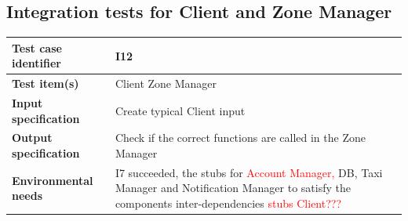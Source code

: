 \documentclass[a4paper,11pt]{report} %
\begin{document}
		\subsection{Integration tests for Client and Zone Manager}
			\begin{minipage}{\linewidth}
			\end{minipage}		
		\begin{center}
			\renewcommand{\arraystretch}{1.2}
			\setlength{\tabcolsep}{24pt}
			\begin{tabular}{ l  p{9cm}}\hline
				\textbf{Test case identifier} & I12\\\hline
				\textbf{Test item(s)} & Client \textrightarrow Zone Manager\\\hline
				\textbf{Input specification} & Create typical Client input \\\hline
				\textbf{Output specification} & Check if the correct functions are called in the Zone Manager\\\hline
				\textbf{Environmental needs} &  I7 succeeded, the stubs for \textcolor{red}{Account Manager, }DB, Taxi Manager and Notification Manager to satisfy the components inter-dependencies \textcolor{red}{stubs Client???}\\\hline
			\end{tabular}
		\end{center}	
\end{document}
